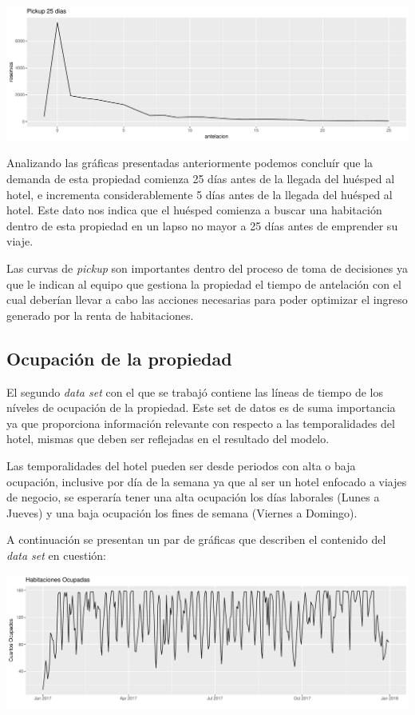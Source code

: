 \color{fgcolor}
\includegraphics[width=\maxwidth]{figures/pickupzoom-1} 

Analizando las gráficas presentadas anteriormente podemos concluír que la demanda de esta propiedad comienza 25 días antes de la llegada del huésped al hotel, e incrementa considerablemente 5 días antes de la llegada del huésped al hotel. Este dato nos indica que el huésped comienza a buscar una habitación dentro de esta propiedad en un lapso no mayor a 25 días antes de emprender su viaje.

Las curvas de \emph{pickup} son importantes dentro del proceso de toma de decisiones ya que le indican al equipo que gestiona la propiedad el tiempo de antelación con el cual deberían llevar a cabo las acciones necesarias para poder optimizar el ingreso generado por la renta de habitaciones.

\subsection*{Ocupación de la propiedad}

El segundo \emph{data set} con el que se trabajó contiene las líneas de tiempo de los níveles de ocupación de la propiedad. Este set de datos es de suma importancia ya que proporciona información relevante con respecto a las temporalidades del hotel, mismas que deben ser reflejadas en el resultado del modelo.

Las temporalidades del hotel pueden ser desde periodos con alta o baja ocupación, inclusive por día de la semana ya que al ser un hotel enfocado a viajes de negocio, se esperaría tener una alta ocupación los días laborales (Lunes a Jueves) y una baja ocupación los fines de semana (Viernes a Domingo).

A continuación se presentan un par de gráficas que describen el contenido del \emph{data set} en cuestión:

\color{fgcolor}
\includegraphics[width=\maxwidth]{figures/HabitacionesOcupadas-1} 

